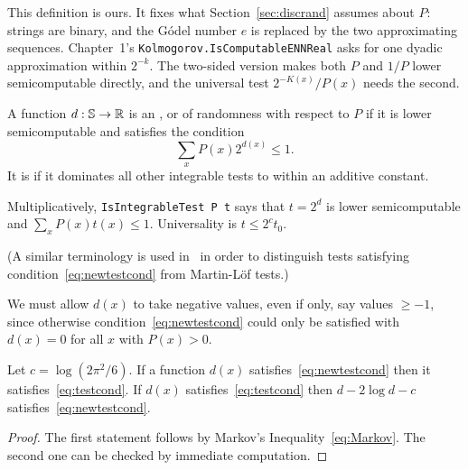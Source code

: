 \begin{formalization}
This definition is ours. It fixes what Section~\ref{sec:discrand} assumes about \( P \):
strings are binary, and the G\'odel number \( e \) is replaced by the two approximating
sequences. Chapter~1's \texttt{Kolmogorov.IsComputableENNReal} asks for one dyadic
approximation within \( 2^{-k} \). The two-sided version makes both \( P \) and \( 1/P \)
lower semicomputable directly, and the universal test \( 2^{-K(x)}/P(x) \) needs the second.
\end{formalization}

 \begin{definition}
  \label{def:g2.2.1}
  \leanok
A function $d:\mathbb{S}\to\mathbb{R}$ is an , or
 of randomness
with respect to $P$ if it is lower semicomputable and satisfies the condition
 \begin{equation} 	\label{eq:newtestcond}
\sum_{x} P(x)2^{d(x)} \le 1.
 \end{equation}
It is  if it dominates all other integrable tests to within an
additive constant.
 \end{definition}

\begin{formalization}
Multiplicatively, \texttt{IsIntegrableTest P t} says that \( t = 2^{d} \) is lower
semicomputable and \( \sum_{x} P(x) t(x) \le 1 \). Universality is \( t \le 2^{c} t_{0} \).
\end{formalization}

(A similar terminology is used in~\cite{LiViBook97} in order to distinguish
tests satisfying condition~\eqref{eq:newtestcond} from Martin-L\"of tests.)

\begin{remark}
  We must allow $d(x)$ to take negative values, even if only, say values
$\ge -1$, since otherwise condition~\eqref{eq:newtestcond} could only be satisfied
with $d(x)=0$ for all $x$ with $P(x)>0$.
\end{remark}

 \begin{proposition}\label{propo:ml-integrable}
  \leanok
Let $c = \log(2\pi^{2}/6)$.
If a function $d(x)$ satisfies~\eqref{eq:newtestcond} then it
satisfies~\eqref{eq:testcond}.
If $d(x)$ satisfies~\eqref{eq:testcond} then $d - 2\log d - c$
satisfies~\eqref{eq:newtestcond}.
 \end{proposition}
 \begin{proof}
  \leanok
The first statement follows by Markov's Inequality~\eqref{eq:Markov}.
The second one can be checked by immediate computation.
 \end{proof}

